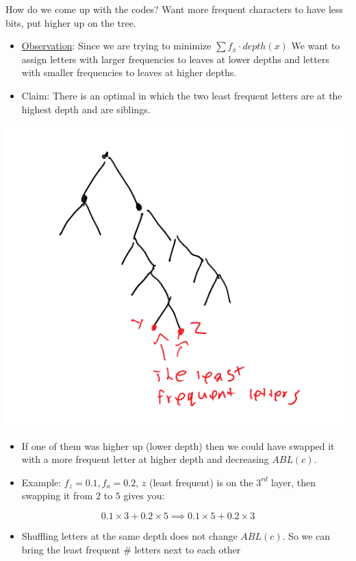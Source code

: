 \documentclass[11pt]{article}
\begin{document}
How do we come up with the codes? Want more frequent characters to have less bits, put higher up on the tree.
\begin{itemize}
\item \uline{Observation}: Since we are trying to minimize \(\sum f_x \cdot depth(x)\) We want to assign letters with larger frequencies to leaves at lower depths and letters with smaller frequencies to leaves at higher depths.
\item Claim: There is an optimal in which the two least frequent letters are at the highest depth and are siblings.
\end{itemize}
\begin{center}
\includegraphics[width=.9\linewidth]{./Images/i63.png}
\end{center}
\begin{itemize}
\item If one of them was higher up (lower depth) then we could have swapped it with a more frequent letter at higher depth and decreasing \(ABL(c)\).
\item Example: \(f_z =0.1, f_a = 0.2\), \(z\) (least frequent) is on the \(3^{rd}\) layer, then swapping it from \(2\) to \(5\) gives you:
\end{itemize}
$$ 0.1 \times 3 + 0.2 \times 5 \implies 0.1 \times 5 + 0.2 \times 3$$
\begin{itemize}
\item Shuffling letters at the same depth does not change \(ABL(c)\). So we can bring the least frequent \# letters next to each other
\end{itemize}
\end{document}
